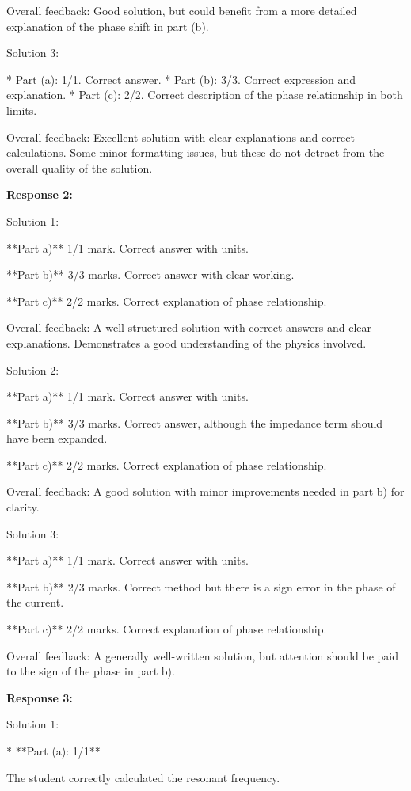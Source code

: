 \documentclass[a4paper,11pt]{article}
\begin{document}
Overall feedback: Good solution, but could benefit from a more detailed explanation of the phase shift in part (b).

Solution 3:

*   Part (a): 1/1. Correct answer.
*   Part (b): 3/3. Correct expression and explanation.
*   Part (c): 2/2. Correct description of the phase relationship in both limits.

Overall feedback: Excellent solution with clear explanations and correct calculations. Some minor formatting issues, but these do not detract from the overall quality of the solution.

\bigskip    
\textbf{Response 2:}

Solution 1:

**Part a)** 1/1 mark. Correct answer with units.

**Part b)** 3/3 marks. Correct answer with clear working.

**Part c)** 2/2 marks. Correct explanation of phase relationship.

Overall feedback: A well-structured solution with correct answers and clear explanations. Demonstrates a good understanding of the physics involved.

Solution 2:

**Part a)** 1/1 mark. Correct answer with units.

**Part b)** 3/3 marks. Correct answer, although the impedance term should have been expanded.

**Part c)** 2/2 marks. Correct explanation of phase relationship.

Overall feedback: A good solution with minor improvements needed in part b) for clarity.

Solution 3:

**Part a)** 1/1 mark. Correct answer with units.

**Part b)** 2/3 marks. Correct method but there is a sign error in the phase of the current.

**Part c)** 2/2 marks. Correct explanation of phase relationship.

Overall feedback: A generally well-written solution, but attention should be paid to the sign of the phase in part b).

\bigskip    
\textbf{Response 3:}

Solution 1:

*   **Part (a): 1/1**

    The student correctly calculated the resonant frequency.
\end{document}

